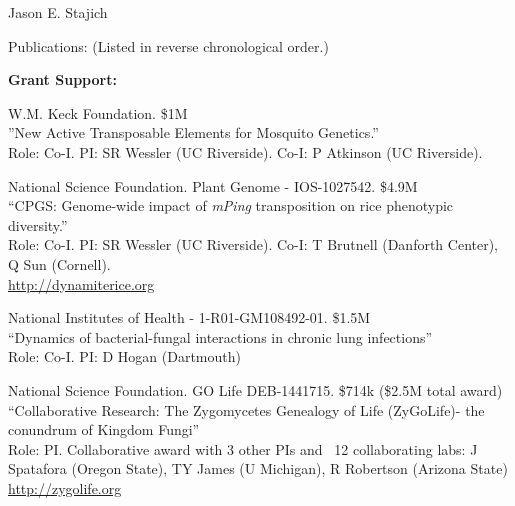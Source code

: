\documentclass[10pt]{article}
\begin{document}
\begin{cv}{\centerline{Jason E. Stajich}}
\begin{cvlist}{Publications: (Listed in reverse chronological order.)}
\end{cvlist}
\setlength{\cvlabelwidth}{24mm}


\begin{cvlistcompact}{\bf Grant Support:}
\item [{\bf Ongoing support}]

\item [2011-2016] W.M. Keck Foundation. \$1M \\
''New Active Transposable Elements for Mosquito Genetics.'' \\
Role: Co-I. PI: SR Wessler (UC Riverside). Co-I: P Atkinson (UC Riverside). 

\item [2011-2017] National Science Foundation. Plant Genome -
  IOS-1027542. \$4.9M  \\
  ``CPGS: Genome-wide impact of \textit{mPing} transposition on rice phenotypic diversity.'' \\
Role: Co-I. PI: SR Wessler (UC Riverside). Co-I: T Brutnell (Danforth
Center), Q Sun (Cornell). \\
\url{http://dynamiterice.org}

\item [2014-2017] National Institutes of Health - 1-R01-GM108492-01. \$1.5M \\
``Dynamics of bacterial-fungal interactions in chronic lung infections'' \\
Role: Co-I. PI: D Hogan (Dartmouth)

\item [2015-2018] National Science Foundation. GO Life
  DEB-1441715. \$714k (\$2.5M total award) \\
``Collaborative Research: The Zygomycetes Genealogy of Life
  (ZyGoLife)- the conundrum of Kingdom Fungi'' \\
  Role: PI. Collaborative award with 3 other PIs and ~12
  collaborating labs: J Spatafora (Oregon State), TY James (U
  Michigan), R Robertson (Arizona State) \\
\url{http://zygolife.org} 


\end{cvlistcompact}
\end{cv}
\end{document}
